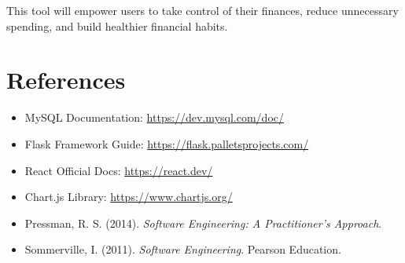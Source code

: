 \documentclass[a4paper,12pt]{article}
\begin{document}

This tool will empower users to take control of their finances, reduce unnecessary spending, and build healthier financial habits.

\section{References}

\begin{itemize}
    \item MySQL Documentation: \url{https://dev.mysql.com/doc/}
    \item Flask Framework Guide: \url{https://flask.palletsprojects.com/}
    \item React Official Docs: \url{https://react.dev/}
    \item Chart.js Library: \url{https://www.chartjs.org/}
    \item Pressman, R. S. (2014). \textit{Software Engineering: A Practitioner’s Approach}.
    \item Sommerville, I. (2011). \textit{Software Engineering}. Pearson Education.
\end{itemize}
\end{document}
